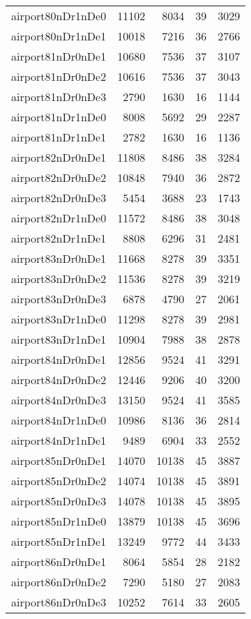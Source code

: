 \begin{tabular}{lrrrr}
airport80nDr1nDe0 & 11102 & 8034 & 39 & 3029 \\
airport80nDr1nDe1 & 10018 & 7216 & 36 & 2766 \\
airport81nDr0nDe1 & 10680 & 7536 & 37 & 3107 \\
airport81nDr0nDe2 & 10616 & 7536 & 37 & 3043 \\
airport81nDr0nDe3 & 2790 & 1630 & 16 & 1144 \\
airport81nDr1nDe0 & 8008 & 5692 & 29 & 2287 \\
airport81nDr1nDe1 & 2782 & 1630 & 16 & 1136 \\
airport82nDr0nDe1 & 11808 & 8486 & 38 & 3284 \\
airport82nDr0nDe2 & 10848 & 7940 & 36 & 2872 \\
airport82nDr0nDe3 & 5454 & 3688 & 23 & 1743 \\
airport82nDr1nDe0 & 11572 & 8486 & 38 & 3048 \\
airport82nDr1nDe1 & 8808 & 6296 & 31 & 2481 \\
airport83nDr0nDe1 & 11668 & 8278 & 39 & 3351 \\
airport83nDr0nDe2 & 11536 & 8278 & 39 & 3219 \\
airport83nDr0nDe3 & 6878 & 4790 & 27 & 2061 \\
airport83nDr1nDe0 & 11298 & 8278 & 39 & 2981 \\
airport83nDr1nDe1 & 10904 & 7988 & 38 & 2878 \\
airport84nDr0nDe1 & 12856 & 9524 & 41 & 3291 \\
airport84nDr0nDe2 & 12446 & 9206 & 40 & 3200 \\
airport84nDr0nDe3 & 13150 & 9524 & 41 & 3585 \\
airport84nDr1nDe0 & 10986 & 8136 & 36 & 2814 \\
airport84nDr1nDe1 & 9489 & 6904 & 33 & 2552 \\
airport85nDr0nDe1 & 14070 & 10138 & 45 & 3887 \\
airport85nDr0nDe2 & 14074 & 10138 & 45 & 3891 \\
airport85nDr0nDe3 & 14078 & 10138 & 45 & 3895 \\
airport85nDr1nDe0 & 13879 & 10138 & 45 & 3696 \\
airport85nDr1nDe1 & 13249 & 9772 & 44 & 3433 \\
airport86nDr0nDe1 & 8064 & 5854 & 28 & 2182 \\
airport86nDr0nDe2 & 7290 & 5180 & 27 & 2083 \\
airport86nDr0nDe3 & 10252 & 7614 & 33 & 2605 \\

\end{tabular}
